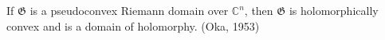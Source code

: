 If $\mathfrak{G}$ is a pseudoconvex Riemann domain over $\mathbb{C}^n$, then $\mathfrak{G}$ is holomorphically convex and is a domain of holomorphy. (Oka, 1953)
